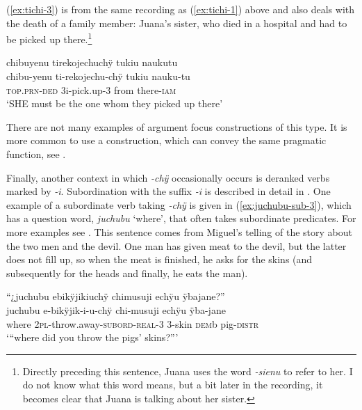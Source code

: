 (\ref{ex:tichi-3}) is from the same recording as (\ref{ex:tichi-1}) above and also deals with the death of a family member: Juana’s sister, who died in a hospital and had to be picked up there.\footnote{Directly preceding this sentence, Juana uses the word \textit{-sienu} to refer to her. I do not know what this word means, but a bit later in the recording, it becomes clear that Juana is talking about her sister.}

\ea\label{ex:tichi-3}
\begingl
\glpreamble chibuyenu tirekojechuchÿ tukiu naukutu\\
\gla chibu-yenu ti-rekojechu-chÿ tukiu nauku-tu\\
\textsc{top.prn}-\textsc{ded} 3i-pick.up-3 from there-\textsc{iam}\\
\glft ‘SHE must be the one whom they picked up there’
\endgl
\trailingcitation{[jxx-p120430l-2.295]}
\xe

There are not many examples of argument focus constructions of this type. It is more common to use a  construction, which can convey the same pragmatic function, see .

Finally, another context in which \textit{-chÿ} occasionally occurs is deranked verbs marked by \textit{-i}. Subordination with the suffix \textit{-i} is described in detail in . One example of a subordinate verb taking \textit{-chÿ} is given in (\ref{ex:juchubu-sub-3}), which has a question word, \textit{juchubu} ‘where’, that often takes subordinate predicates. For more examples see . This sentence comes from Miguel’s telling of the story about the two men and the devil. One man has given meat to the devil, but the latter does not fill up, so when the meat is finished, he asks for the skins (and subsequently for the heads and finally, he eats the man).


\ea\label{ex:juchubu-sub-3}
\begingl 
\glpreamble “¿juchubu ebikÿjikiuchÿ chimusuji echÿu ÿbajane?”\\
\gla juchubu e-bikÿjik-i-u-chÿ chi-musuji echÿu ÿba-jane\\ 
\glb where 2\textsc{pl}-throw.away-\textsc{subord}-\textsc{real}-3 3-skin \textsc{dem}b pig-\textsc{distr}\\ 
\glft ‘“where did you throw the pigs’ skins?”’
\trailingcitation{[mxx-n101017s-1.055-056]}
\xe


